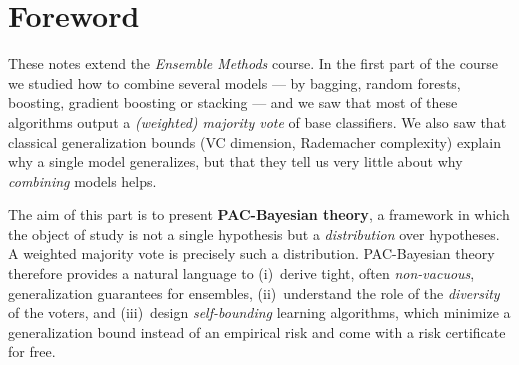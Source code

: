 \documentclass[11pt,a4paper]{article}
\numberwithin{equation}{section}
\begin{document}
\vspace{0.4cm}
\begin{center}
\end{center}

\newpage
\tableofcontents

\newpage
\section*{Foreword}

These notes extend the \emph{Ensemble Methods} course. In the first part of
the course we studied how to combine several models --- by bagging, random
forests, boosting, gradient boosting or stacking --- and we saw that most of
these algorithms output a \emph{(weighted) majority vote} of base classifiers.
We also saw that classical generalization bounds (VC dimension, Rademacher
complexity) explain why a single model generalizes, but that they tell us
very little about why \emph{combining} models helps.

The aim of this part is to present \textbf{PAC-Bayesian theory}, a framework
in which the object of study is not a single hypothesis but a
\emph{distribution} over hypotheses. A weighted majority vote is precisely
such a distribution. PAC-Bayesian theory therefore provides a natural language to
(i)~derive tight, often \emph{non-vacuous}, generalization guarantees for
ensembles, (ii)~understand the role of the \emph{diversity} of the voters, and
(iii)~design \emph{self-bounding} learning algorithms, which minimize a
generalization bound instead of an empirical risk and come with a risk
certificate for free.
\end{document}

